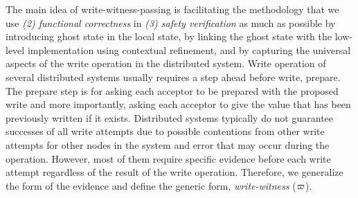 The main idea of write-witness-passing is facilitating the methodology that we use \textit{(2) functional correctness} in
\textit{(3) safety verification} as much as possible by
introducing ghost state in the local state, by linking the ghost state with the low-level
implementation using contextual refinement, and by capturing the universal aspects of the write operation in the distributed system.
Write operation of several distributed systems usually requires a step ahead before write, prepare. 
The prepare step is for 
asking each acceptor to be prepared with the proposed write
and more importantly, asking each acceptor to give the value that has been previously written if it exists.
Distributed systems typically do not guarantee successes of all write attempts due to possible contentions from other write attempts for 
other nodes in the system
and error that may occur during the operation. 
However, most of them require specific evidence before each write attempt regardless of the result of the write operation. 
Therefore, we generalize the form of the evidence and define the generic form, \textit{write-witness} ($\varpi$).

